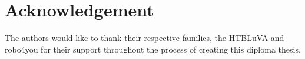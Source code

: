 \chapter{Acknowledgement}

The authors would like to thank their respective families, the HTBLuVA and robo4you 
for their support throughout the process of creating this diploma thesis. 
